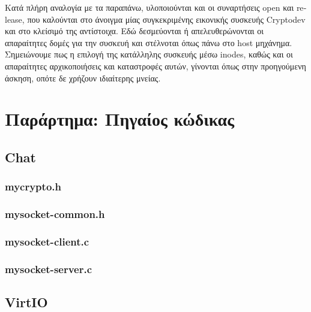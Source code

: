 \documentclass[12pt,titlepage]{article}
\newcommand{\en}{\textlatin}
\begin{document}
Κατά πλήρη αναλογία με τα παραπάνω, υλοποιούνται και οι συναρτήσεις \en{open} και \en{release}, που καλούνται στο άνοιγμα μίας συγκεκριμένης εικονικής συσκευής \en{Cryptodev} και στο κλείσιμό της αντίστοιχα. Εδώ δεσμεύονται ή απελευθερώνονται οι απαραίτητες δομές για την συσκευή και στέλνοται όπως πάνω στο \en{host} μηχάνημα. Σημειώνουμε πως η επιλογή της κατάλληλης συσκευής μέσω \en{inodes}, καθώς και οι απαραίτητες αρχικοποιήσεις και καταστροφές αυτών, γίνονται όπως στην προηγούμενη άσκηση, οπότε δε χρήζουν ιδιαίτερης μνείας.

\newpage

\section{Παράρτημα: Πηγαίος κώδικας}

\subsection{\en{Chat}}

\latintext

\subsubsection{mycrypto.h}



\subsubsection{mysocket-common.h}



\subsubsection{mysocket-client.c}



\subsubsection{mysocket-server.c}



\subsection{\en{VirtIO}}
\end{document}
